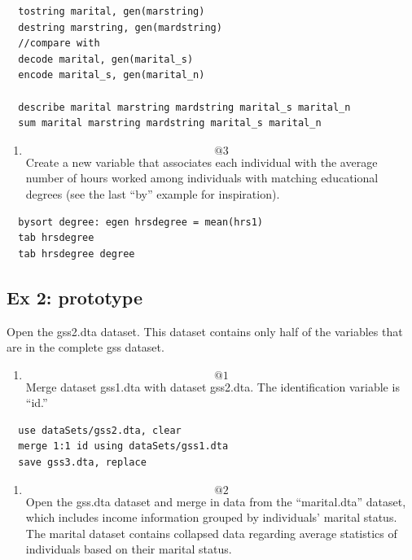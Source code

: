 \documentclass[]{book}
\providecommand{\tightlist}{%
  \setlength{\itemsep}{0pt}\setlength{\parskip}{0pt}}
\begin{document}
\begin{verbatim}
  tostring marital, gen(marstring)
  destring marstring, gen(mardstring)
  //compare with
  decode marital, gen(marital_s)
  encode marital_s, gen(marital_n)

  describe marital marstring mardstring marital_s marital_n
  sum marital marstring mardstring marital_s marital_n
\end{verbatim}

\begin{enumerate}
\def\labelenumi{\arabic{enumi}.}
\setcounter{enumi}{2}
\tightlist
\item
  \[@3\] Create a new variable that associates each individual with the
  average number of hours worked among individuals with matching
  educational degrees (see the last ``by'' example for inspiration).
\end{enumerate}

\begin{verbatim}
  bysort degree: egen hrsdegree = mean(hrs1)
  tab hrsdegree
  tab hrsdegree degree 
\end{verbatim}

\subsection{Ex 2: prototype}\label{ex-2-prototype-4}

Open the gss2.dta dataset. This dataset contains only half of the
variables that are in the complete gss dataset.

\begin{enumerate}
\def\labelenumi{\arabic{enumi}.}
\tightlist
\item
  \[@1\] Merge dataset gss1.dta with dataset gss2.dta. The
  identification variable is ``id.''
\end{enumerate}

\begin{verbatim}
  use dataSets/gss2.dta, clear
  merge 1:1 id using dataSets/gss1.dta
  save gss3.dta, replace
\end{verbatim}

\begin{enumerate}
\def\labelenumi{\arabic{enumi}.}
\setcounter{enumi}{1}
\tightlist
\item
  \[@2\] Open the gss.dta dataset and merge in data from the
  ``marital.dta'' dataset, which includes income information grouped by
  individuals' marital status. The marital dataset contains collapsed
  data regarding average statistics of individuals based on their
  marital status.
\end{enumerate}
\end{document}
